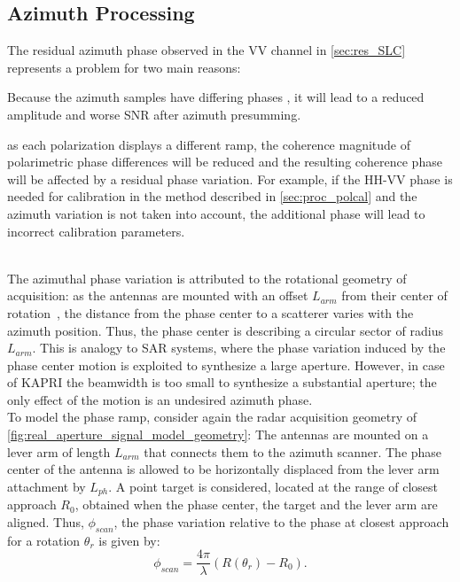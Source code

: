 \subsection{Azimuth Processing}\label{sec:azimuth_processing}
The residual  azimuth phase observed in the VV channel in \autoref{sec:res_SLC} represents a problem for two main reasons: \begin{enumerate*}
	\item Because the azimuth samples have differing phases
	, it will lead to a reduced amplitude and worse SNR after azimuth presumming. 
  \item as each polarization displays a different ramp, the coherence magnitude of polarimetric phase differences will be reduced and the resulting coherence phase will be affected by a residual phase variation. For example, if the HH-VV phase is needed for calibration in the method described in \autoref{sec:proc_polcal} and the azimuth variation is not taken into account, the additional phase will lead to incorrect calibration parameters.\label{item:phase_variation}\end{enumerate*}\\
The azimuthal phase variation is attributed to the rotational geometry of acquisition: as the antennas are mounted with an  offset $L_{arm}$ from their center of rotation~\cite{Lee2014}, the distance from the phase center to a scatterer varies with the azimuth position. Thus, the phase center is describing a circular sector of radius $L_{arm}$. This is analogy to SAR systems, where the phase variation induced by the phase center motion is exploited to synthesize a large aperture. However,  in case of KAPRI the beamwidth is too small to synthesize a substantial aperture; the only effect of the motion is an undesired azimuth phase.\\
To model the phase ramp, consider again the radar acquisition geometry of \autoref{fig:real_aperture_signal_model_geometry}:
The antennas are mounted on a lever arm of length $L_{arm}$ that connects them to the azimuth scanner.
The phase center of the antenna is allowed to be horizontally displaced from the lever arm attachment by $L_{ph}$.
A point target is considered, located at the  range of closest approach $R_{0}$, obtained when the phase center, the target and the lever arm are aligned. Thus, $\phi_{scan}$, the phase variation relative to the phase at closest approach for a rotation  $\theta_r$  is given by:
\begin{equation}\label{eq:range_phase}
	\phi_{scan} = \frac{4 \pi}{\lambda}\left(R\left(\theta_r\right) - R_0\right) .
\end{equation}

